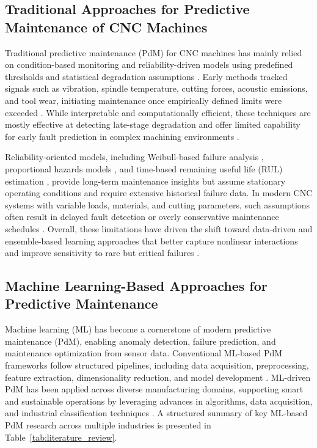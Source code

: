 \documentclass[final,5p, twocolumn]{elsarticle}
\begin{document}
\subsection{Traditional Approaches for Predictive Maintenance of CNC Machines}

Traditional predictive maintenance (PdM) for CNC machines has mainly relied on condition-based monitoring and reliability-driven models using predefined thresholds and statistical degradation assumptions \cite{nascimentocomputational,goyal2015condition}. Early methods tracked signals such as vibration, spindle temperature, cutting forces, acoustic emissions, and tool wear, initiating maintenance once empirically defined limits were exceeded \cite{yedurkar2025systematic}. While interpretable and computationally efficient, these techniques are mostly effective at detecting late-stage degradation and offer limited capability for early fault prediction in complex machining environments \cite{kusiak2023predictive}.

Reliability-oriented models, including Weibull-based failure analysis \cite{tian2025research}, proportional hazards models \cite{li2021early}, and time-based remaining useful life (RUL) estimation \cite{unal2023condition}, provide long-term maintenance insights but assume stationary operating conditions and require extensive historical failure data. In modern CNC systems with variable loads, materials, and cutting parameters, such assumptions often result in delayed fault detection or overly conservative maintenance schedules \cite{wang2020big,qin2025prognostic}. Overall, these limitations have driven the shift toward data-driven and ensemble-based learning approaches that better capture nonlinear interactions \cite{khalili2025time,shaikh2024fundamental} and improve sensitivity to rare but critical failures \cite{hung2021improved,varalakshmi2025optimized}.

\subsection{Machine Learning-Based Approaches for Predictive Maintenance}

Machine learning (ML) has become a cornerstone of modern predictive maintenance (PdM), enabling anomaly detection, failure prediction, and maintenance optimization from sensor data. Conventional ML-based PdM frameworks follow structured pipelines, including data acquisition, preprocessing, feature extraction, dimensionality reduction, and model development \cite{Arena2024-dy,assafo2023stability}. ML-driven PdM has been applied across diverse manufacturing domains, supporting smart and sustainable operations by leveraging advances in algorithms, data acquisition, and industrial classification techniques \cite{ccinar2020machine}. A structured summary of key ML-based PdM research across multiple industries is presented in Table~\ref{tab:literature_review}.
\end{document}
